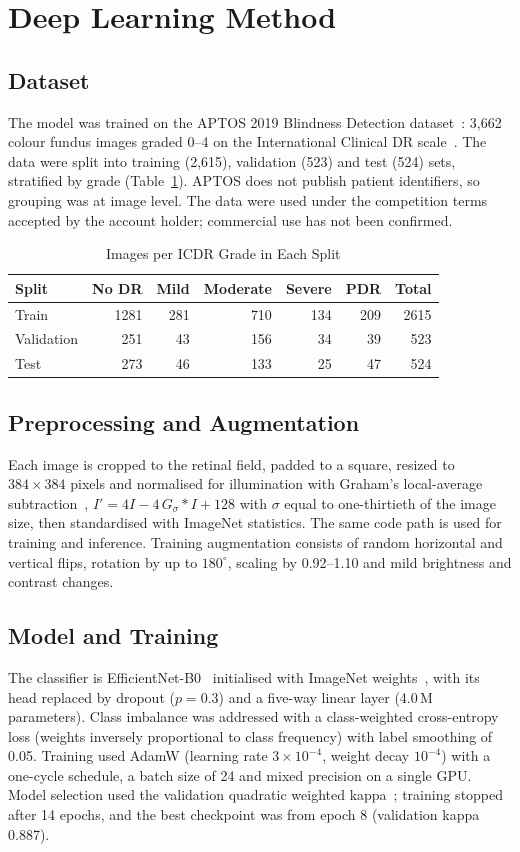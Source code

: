 \documentclass[conference]{IEEEtran}
\begin{document}
\section{Deep Learning Method}
\subsection{Dataset}
The model was trained on the APTOS 2019 Blindness Detection dataset~\cite{aptos2019}: 3,662 colour fundus images
graded 0--4 on the International Clinical DR scale~\cite{wilkinson2003}. The data were split into training (2,615),
validation (523) and test (524) sets, stratified by grade (Table~\ref{tab:data}). APTOS does not publish patient
identifiers, so grouping was at image level. The data were used under the competition terms accepted by the account
holder; commercial use has not been confirmed.

\begin{table}[t]
\caption{Images per ICDR Grade in Each Split}
\label{tab:data}
\centering\scriptsize
\begin{tabular}{@{}lrrrrrr@{}}
\toprule
Split & No DR & Mild & Moderate & Severe & PDR & Total \\
\midrule
Train & 1281 & 281 & 710 & 134 & 209 & 2615 \\
Validation & 251 & 43 & 156 & 34 & 39 & 523 \\
Test & 273 & 46 & 133 & 25 & 47 & 524 \\
\bottomrule
\end{tabular}
\end{table}

\subsection{Preprocessing and Augmentation}
Each image is cropped to the retinal field, padded to a square, resized to $384\times384$ pixels and normalised for
illumination with Graham's local-average subtraction~\cite{graham2015},
$I' = 4I - 4\,G_\sigma * I + 128$ with $\sigma$ equal to one-thirtieth of the image size, then standardised with
ImageNet statistics. The same code path is used for training and inference. Training augmentation consists of random
horizontal and vertical flips, rotation by up to $180^\circ$, scaling by 0.92--1.10 and mild brightness and contrast
changes.

\subsection{Model and Training}
The classifier is EfficientNet-B0~\cite{tan2019} initialised with ImageNet weights~\cite{deng2009}, with its head
replaced by dropout ($p=0.3$) and a five-way linear layer (4.0\,M parameters). Class imbalance was addressed with a
class-weighted cross-entropy loss (weights inversely proportional to class frequency) with label smoothing of 0.05.
Training used AdamW (learning rate $3\times10^{-4}$, weight decay $10^{-4}$) with a one-cycle schedule, a batch size of
24 and mixed precision on a single GPU. Model selection used the validation quadratic weighted kappa~\cite{cohen1968};
training stopped after 14 epochs, and the best checkpoint was from epoch 8 (validation kappa 0.887).
\end{document}
